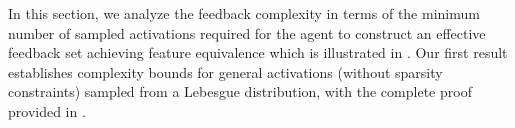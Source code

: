 In this section, we analyze the feedback complexity in terms of the minimum number of sampled activations required for the agent to construct an effective feedback set achieving feature equivalence which is illustrated in . Our first result establishes complexity bounds for general activations (without sparsity constraints) sampled from a Lebesgue distribution, with the complete proof provided in .





